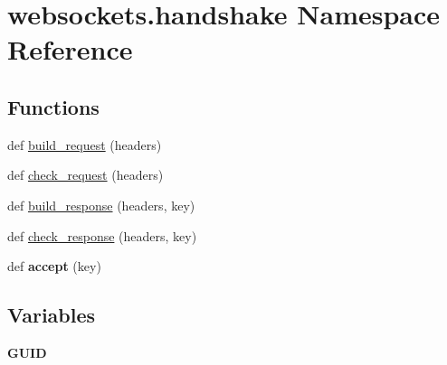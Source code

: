 \hypertarget{namespacewebsockets_1_1handshake}{}\section{websockets.\+handshake Namespace Reference}
\label{namespacewebsockets_1_1handshake}
\subsection*{Functions}
\begin{DoxyCompactItemize}
\item 
def \hyperlink{namespacewebsockets_1_1handshake_a5fe8d524dcf44ac708fd508eae3ff81c}{build\+\_\+request} (headers)
\item 
def \hyperlink{namespacewebsockets_1_1handshake_ac1ce106fd4af8a831be403588df35c44}{check\+\_\+request} (headers)
\item 
def \hyperlink{namespacewebsockets_1_1handshake_a636125b0e4dee92d2a9ba759e3b1d0ee}{build\+\_\+response} (headers, key)
\item 
def \hyperlink{namespacewebsockets_1_1handshake_a358fc900cbcbb82de84710c8046987a6}{check\+\_\+response} (headers, key)
\item 
\mbox{\label{namespacewebsockets_1_1handshake_a88a518d98729bfce13609463ea54241c}} 
def {\bfseries accept} (key)
\end{DoxyCompactItemize}
\subsection*{Variables}
\begin{DoxyCompactItemize}
\item 
\mbox{\label{namespacewebsockets_1_1handshake_a3cc02b16afb08a9162959b587991c8e8}} 
{\bfseries G\+U\+ID}
\end{DoxyCompactItemize}


